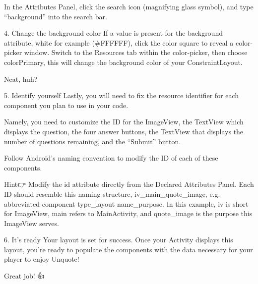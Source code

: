         In the Attributes Panel, click the search icon (magnifying glass symbol), and type “background” into the search bar.

    4. Change the background color
        If a value is present for the background attribute, white for example (#FFFFFF), click the color square to reveal a color-picker window. Switch to the Resources tab within the color-picker, then choose colorPrimary, this will change the background color of your ConstraintLayout.

        Neat, huh?

    5. Identify yourself
        Lastly, you will need to fix the resource identifier for each component you plan to use in your code.

        Namely, you need to customize the ID for the ImageView, the TextView which displays the question, the four answer buttons, the TextView that displays the number of questions remaining, and the “Submit” button.

        Follow Android’s naming convention to modify the ID of each of these components.

        Hint👉 Modify the id attribute directly from the Declared Attributes Panel.
        Each ID should resemble this naming structure, iv_main_quote_image, e.g. {abbreviated component type}\_{layout name}\_{purpose}.
        In this example, iv is short for ImageView, main refers to MainActivity, and quote_image is the purpose this ImageView serves.

    6. It’s ready
        Your layout is set for success. Once your Activity displays this layout, you’re ready to populate the components with the data necessary for your player to enjoy Unquote!

        Great job! 👍